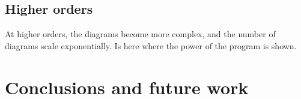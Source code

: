 \documentclass[11pt,a4paper,twoside,pdf]{article}
\numberwithin{equation}{section}
\begin{document}
\subsection{Higher orders}

At higher orders, the diagrams become more complex, and the number of diagrams scale 
exponentially. Is here where the power of the program is shown. 

\section{Conclusions and future work} \label{sec:conclusions}



\newpage

\end{document}
